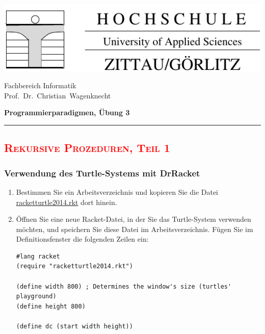 \documentclass[12pt,a4paper]{scrartcl}
\newcommand\HR{\rule{175mm}{0.4pt}}
\begin{document}
\begin{minipage}[b]{174mm}
  \begin{minipage}[t]{80mm}
    \par\vspace{0mm}
    \textcolor{blue}{\includegraphics[scale=0.8]{fh-logo.pdf}}
  \end{minipage}\hfill
  \begin{minipage}[t]{76mm}                      %
    \par\vspace{2mm}
    {\sc Fachbereich Informatik}\\
    {\sc Prof.~Dr.~Christian~Wagenknecht}\\
    \par
    \textbf{Programmierparadigmen, \"{U}bung 3}
  \end{minipage}
\end{minipage}
\HR


\subsection*{\textcolor{red}{\textsc{Rekursive Prozeduren, Teil 1}}}


\subsubsection*{Verwendung des Turtle-Systems mit DrRacket}

\begin{enumerate}
\item 
Bestimmen Sie ein Arbeitsverzeichnis und kopieren Sie die Datei\\ \href{http://f-ei.hszg.de/wagenkn/PP-Racket/downloads/racket/racketturtle2014.rkt}{racketturtle2014.rkt} dort hinein.

\item 
Öffnen Sie eine neue Racket-Datei, in der Sie das Turtle-System verwenden möchten, und speichern Sie diese Datei im Arbeitsverzeichnis. F\"{u}gen Sie im Definitionsfenster die folgenden Zeilen ein:
\begin{verbatim}
#lang racket
(require "racketturtle2014.rkt")

(define width 800) ; Determines the window's size (turtles' playground)
(define height 800)

(define dc (start width height))  
\end{verbatim}
\end{enumerate}
\end{document}
